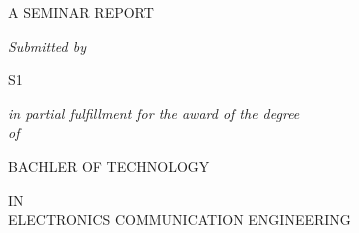 \begin{titlepage}
	
	\thispagestyle{empty}
         
	\begin{center}
		\vspace*{.2cm}
		\textbf{\fontsize{18}{12}}
	\end{center}

	\vspace*{0.5cm}

	\begin{center}
		\fontsize{14}{12}\MakeUppercase{A SEMINAR REPORT}
	\end{center}

	\vspace*{0.5cm}

	\begin{center}
		\textit{\fontsize{14}{12}Submitted by}
	\end{center}

	\vspace*{0.5cm}

	\begin{center}
		\fontsize{16}{12}\selectfont S1
	\end{center}

    	\vspace{0.5cm}

	\begin{center}
		\textit{\fontsize{14}{12}in partial fulfillment for the award of the degree\\of\\}
	\end{center}

	\vspace*{0.5cm}

	\begin{center}
		\fontsize{16}{12}\MakeUppercase{BACHLER OF TECHNOLOGY}\\
	\end{center}

	\vspace*{0.5cm}

	\begin{center}
		\fontsize{14}{12}\MakeUppercase{IN}\\
		\fontsize{14}{12}\MakeUppercase{Electronics Communication Engineering}\\
	\end{center}

	\vspace*{0.5cm}
	

\end{titlepage}
